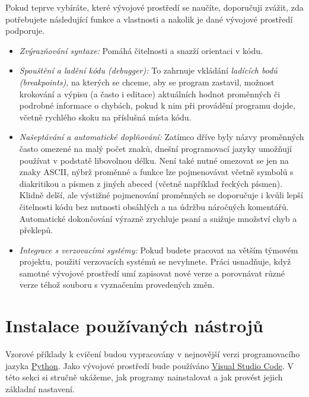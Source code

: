 \documentclass[a4paper,11pt,twoside]{article}
\theoremstyle{red}
\theoremstyle{green}
\begin{document}
        Pokud teprve vybíráte, které vývojové prostředí se naučíte, doporučuji zvážit, zda potřebujete následující funkce a vlastnosti a nakolik je dané vývojové prostředí podporuje.

        \begin{itemize}
            \item \emph{Zvýrazňování syntaxe:} Pomáhá čitelnosti a snazží orientaci v kódu.
            \item \emph{Spouštění a ladění kódu (debugger):} To zahrnuje vkládání \emph{ladících bodů (breakpoints)}, na kterých se chceme, aby se program zastavil, možnost krokování a výpisu (a často i editace) aktuálních hodnot proměnných či podrobné informace o chybách, pokud k nim při provádění programu dojde, včetně rychlého skoku na příslušná místa kódu.
            \item \emph{Našeptávání a automatické doplňování:} Zatímco dříve byly názvy proměnných často omezené na malý počet znaků, dnešní programovací jazyky umožňují používat v podstatě libovolnou délku. Není také nutné omezovat se jen na znaky ASCII, nýbrž proměnné a funkce lze pojmenovávat včetně symbolů s diakritikou a písmen z jiných abeced (včetně například řeckých písmen). Klidně delší, ale výstižné pojmenování proměnných se doporučuje i kvůli lepší čitelnosti kódu bez nutnosti obsáhlých a na údržbu náročných komentářů. Automatické dokončování výrazně zrychluje psaní a snižuje množství chyb a překlepů.
            \item \emph{Integrace s verzovacími systémy:} Pokud budete pracovat na větším týmovém projektu, použití verzovacích systémů se nevyhnete. Práci usnadňuje, když samotné vývojové prostředí umí zapisovat nové verze a porovnávat různé verze téhož souboru s vyznačením provedených změn.
        \end{itemize}

\section{Instalace používaných nástrojů}
\label{sec:Instalace}
    Vzorové příklady k cvičení budou vypracovány v nejnovější verzi programovacího jazyka \href{https://python.org}{Python}.
    Jako vývojové prostředí bude používáno \href{https://code.visualstudio.com}{Visual Studio Code}.
    V této sekci si stručně ukážeme, jak programy nainstalovat a jak provést jejich základní nastavení.
\end{document}
